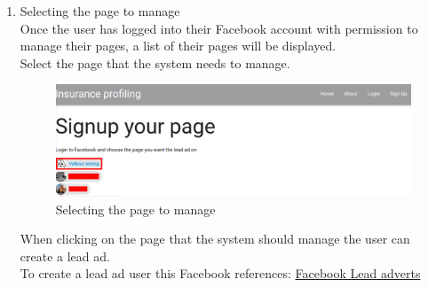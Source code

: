 \documentclass{article}
\begin{document}
\begin{enumerate}
		\item Selecting the page to manage\\
			Once the user has logged into their Facebook account with permission to manage their pages, a list of their pages will be displayed.\\
			Select the page that the system needs to manage.\\
			\begin{figure}[H]
			  \centering
			      \includegraphics[width=\textwidth]{images/select_page.png}
			  \caption{Selecting the page to manage}
			  \label{fig:selectPage}
			\end{figure}
			When clicking on the page that the system should manage the user can create a lead ad.\\
			To create a lead ad user this Facebook references: \href{https://www.facebook.com/business/a/lead-ads}{Facebook Lead adverts}
		\end{enumerate}
\end{document}
